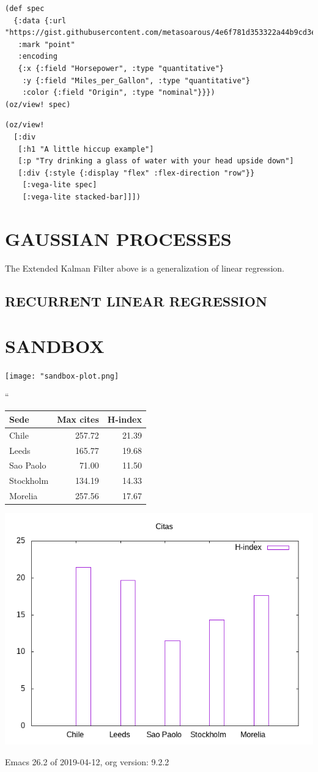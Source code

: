 \documentclass[10pt,oneside,x11names]{article}
\begin{document}
\begin{verbatim}
(def spec
  {:data {:url "https://gist.githubusercontent.com/metasoarous/4e6f781d353322a44b9cd3e4597c532c/raw/cd633d9bb8e0bed4a5b8e66a32b9569ca2147989/cars.json"}
   :mark "point"
   :encoding
   {:x {:field "Horsepower", :type "quantitative"}
    :y {:field "Miles_per_Gallon", :type "quantitative"}
    :color {:field "Origin", :type "nominal"}}})
(oz/view! spec)
\end{verbatim}

\begin{verbatim}
(oz/view!
  [:div
   [:h1 "A little hiccup example"]
   [:p "Try drinking a glass of water with your head upside down"]
   [:div {:style {:display "flex" :flex-direction "row"}}
    [:vega-lite spec]
    [:vega-lite stacked-bar]]])
\end{verbatim}

\section{GAUSSIAN PROCESSES}
\label{gaussian-processes}
The Extended Kalman Filter above is a generalization of linear regression.

\subsection{RECURRENT LINEAR REGRESSION}
\label{recurrent-linear-regression}

\section{SANDBOX}
\label{sec:org5f743ce}

\begin{center}
\texttt{[image: "sandbox-plot.png]}
\end{center}``
\begin{center}
\begin{tabular}{lrr}
Sede & Max cites & H-index\\
\hline
Chile & 257.72 & 21.39\\
Leeds & 165.77 & 19.68\\
Sao Paolo & 71.00 & 11.50\\
Stockholm & 134.19 & 14.33\\
Morelia & 257.56 & 17.67\\
\end{tabular}
\end{center}

\begin{center}
\includegraphics[width=.9\linewidth]{sandbox-plot.png}
\end{center}
Emacs 26.2 of 2019-04-12, org version: 9.2.2
\end{document}
